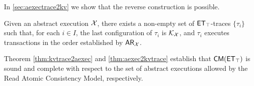 

In \cref{sec:aexectrace2kv} we show that the reverse construction is possible.
\begin{theorem}
\label{thm:aexec2kvtrace}
Given an abstract execution $\mathcal{X}$, there exists a non-empty 
set of $\mathsf{ET}_{\top}$-traces $\{\tau_{i}\}$ such that, for each $i \in I$, the last configuration of $\tau_{i}$ is 
$\mathcal{K}_{\mathcal{X}}$, and $\tau_{i}$ executes transactions in the order established by $\mathsf{AR}_{\mathcal{X}}$. 
\end{theorem}
Theorem \ref{thm:kvtrace2aexec} and \ref{thm:aexec2kvtrace} establish that $\CMs(\ET_{\top})$ is 
sound and complete with respect to the set of abstract executions allowed by the Read Atomic Consistency Model, 
respectively. 


